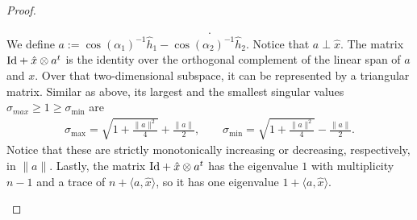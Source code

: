 \documentclass[10pt,a4paper]{article}
\begin{document}
\begin{proof}
\begin{itemize}
\begin{align*}
            .
        \end{align*}
        We define $a := \cos(\alpha_1)^{-1} \hat h_1 - \cos(\alpha_2)^{-1} \hat h_2$. 
        Notice that $a \perp \hat x$. The matrix ${\rm Id} + \hat x \otimes a^{t}$ is the identity over the orthogonal complement of the linear span of $a$ and $x$. Over that two-dimensional subspace, it can be represented by a triangular matrix.
        Similar as above, its largest and the smallest singular values $\sigma_{max} \geq 1 \geq \sigma_{\min}$ are
        \begin{align*}
            \sigma_{\max} = \sqrt{ 1 + \frac{ \|a\|^{2} }{ 4 } } + \frac{ \|a\| }{2},
            \qquad 
            \sigma_{\min} = \sqrt{ 1 + \frac{ \|a\|^{2} }{ 4 } } - \frac{ \|a\| }{2}.     
        \end{align*}
        Notice that these are strictly monotonically increasing or decreasing, respectively, in $\|a\|$.
        \color{red}Lastly, the matrix ${\rm Id} + \hat x \otimes a^{t}$ has the eigenvalue $1$ with multiplicity $n-1$ and a trace of $n + \langle a, \hat x \rangle$,
        so it has one eigenvalue $1 + \langle a, \hat x \rangle$.\color{black}


\end{itemize}
\end{proof}
\end{document}
